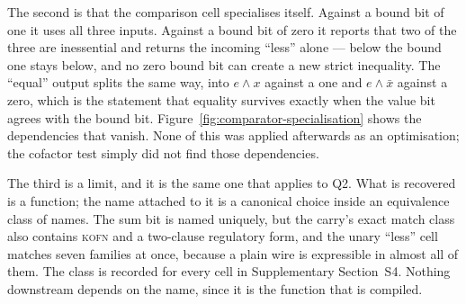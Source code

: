 \documentclass[11pt,a4paper]{article}
\begin{document}
The second is that the comparison cell specialises itself. Against a bound bit
of one it uses all three inputs. Against a bound bit of zero it reports that
two of the three are inessential and returns the incoming ``less'' alone ---
below the bound one stays below, and no zero bound bit can create a new strict
inequality. The ``equal'' output splits the same way, into $e\wedge x$ against a
one and $e\wedge\bar x$ against a zero, which is the statement that equality
survives exactly when the value bit agrees with the bound bit.
Figure~\ref{fig:comparator-specialisation} shows the dependencies that vanish.
None of this was applied afterwards as an optimisation; the cofactor test
simply did not find those dependencies.

The third is a limit, and it is the same one that applies to Q2. What is
recovered is a function; the name attached to it is a canonical choice inside
an equivalence class of names. The sum bit is named uniquely, but the carry's
exact match class also contains \textsc{kofn} and a two-clause regulatory form,
and the unary ``less'' cell matches seven families at once, because a plain
wire is expressible in almost all of them. The class is recorded for every cell
in Supplementary Section~S4. Nothing downstream depends on the name, since it
is the function that is compiled.
\end{document}
